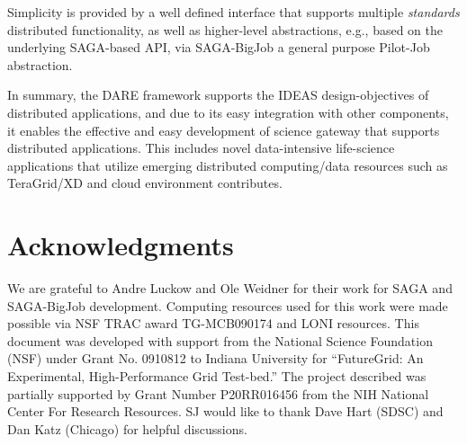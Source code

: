 \documentclass{sig-alternate}
\begin{document}
Simplicity is provided by a well defined interface that supports
multiple {\it standards} distributed functionality, as well as
higher-level abstractions, e.g., based on the underlying SAGA-based
API, via SAGA-BigJob a general purpose Pilot-Job abstraction.

In summary, the DARE framework supports the IDEAS design-objectives of
distributed applications, and due to its easy integration with other
components, it enables the effective and easy development of science
gateway that supports distributed applications. This includes novel
data-intensive life-science applications that utilize emerging
distributed computing/data resources such as TeraGrid/XD and cloud
environment contributes.


\section{Acknowledgments}
We are grateful to Andre Luckow and Ole Weidner for their work for
SAGA and SAGA-BigJob development.  Computing resources used for this
work were made possible via NSF TRAC award TG-MCB090174 and LONI
resources.  This document was developed with support from the National
Science Foundation (NSF) under Grant No.  0910812 to Indiana
University for ``FutureGrid: An Experimental, High-Performance Grid
Test-bed.'' The project described was partially supported by Grant
Number P20RR016456 from the NIH National Center For Research
Resources. SJ would like to thank Dave Hart (SDSC) and Dan Katz
(Chicago) for helpful discussions.

%


\end{document}
